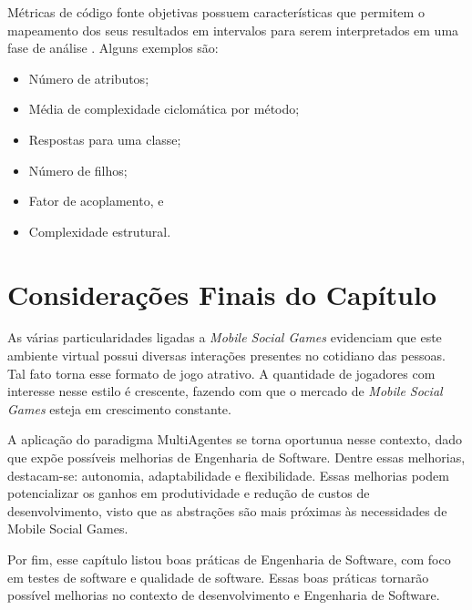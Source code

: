 Métricas de código fonte objetivas possuem características que permitem o mapeamento
dos seus resultados em intervalos para serem interpretados em uma fase de análise
\cite{meirelles2013}. Alguns exemplos são:

\begin{itemize}
  \item Número de atributos;
  \item Média de complexidade ciclomática por método;
  \item Respostas para uma classe;
  \item Número de filhos;
  \item Fator de acoplamento, e
  \item Complexidade estrutural.
\end{itemize}

\section{Considerações Finais do Capítulo}

As várias particularidades ligadas a \textit{Mobile Social Games} evidenciam que este
ambiente virtual possui diversas interações presentes no cotidiano das pessoas. Tal fato torna esse formato de jogo atrativo. A quantidade de
jogadores com interesse nesse estilo é crescente, fazendo com que o mercado
de \textit{Mobile Social Games} esteja em crescimento constante.

A aplicação do paradigma MultiAgentes se torna oportunua nesse contexto, dado que
expõe possíveis melhorias de Engenharia de Software. Dentre essas melhorias,
destacam-se: autonomia, adaptabilidade e flexibilidade. Essas melhorias podem
potencializar os ganhos em produtividade e redução de custos de desenvolvimento,
visto que as abstrações são mais próximas às necessidades de Mobile Social Games.

Por fim, esse capítulo listou boas práticas de Engenharia de Software, com foco
em testes de software e qualidade de software. Essas boas práticas tornarão possível
melhorias no contexto de desenvolvimento e Engenharia de Software.
